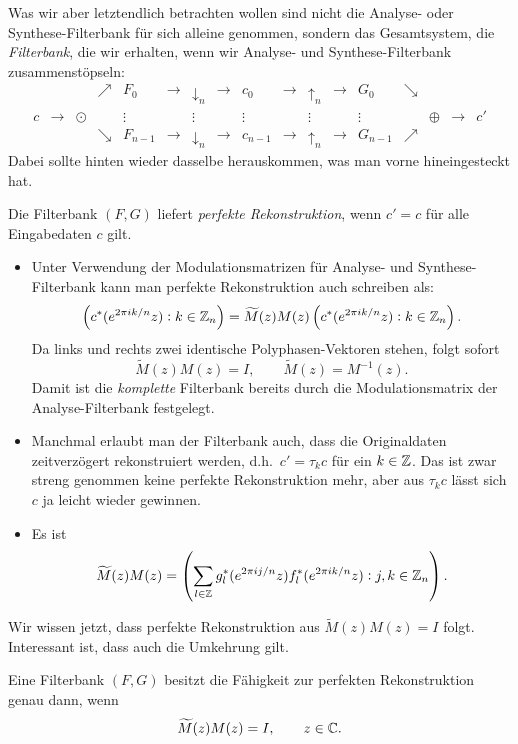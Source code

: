 Was wir aber letztendlich betrachten wollen sind nicht die Analyse- oder Synthese-Filterbank für 
sich alleine genommen, sondern das Gesamtsystem, die \emph{Filterbank}, die wir erhalten, wenn wir
Analyse- und Synthese-Filterbank zusammenstöpseln:
\[
  \begin{array}{*{17}{c}}
    & & & \nearrow & \boxed{F_{0}} & \rightarrow & \boxed{\downarrow_{n}} & \rightarrow & c_{0} 
        & \rightarrow & \boxed{\uparrow_{n}} & \rightarrow & \boxed{G_{0}} & \searrow & & \\
    c & \rightarrow & \odot & & \vdots & & \vdots & & \vdots 
        & & \vdots & & \vdots & & \oplus & \rightarrow & c' \\
    & & & \searrow & \boxed{F_{n-1}} & \rightarrow & \boxed{\downarrow_{n}} & \rightarrow & c_{n-1}
        & \rightarrow & \boxed{\uparrow_{n}} & \rightarrow & \boxed{G_{n-1}} & \nearrow & &
  \end{array}
\]
Dabei sollte hinten wieder dasselbe herauskommen, was man vorne hineingesteckt hat.

\begin{definition}
Die Filterbank $ (F,G) $ liefert \emph{perfekte Rekonstruktion}, wenn $ c' = c $ für alle
Eingabedaten $ c $ gilt.
\end{definition}

\begin{remark}\leavevmode
\begin{itemize}
\item Unter Verwendung der Modulationsmatrizen für Analyse- und Synthese-Filterbank kann man
  perfekte Rekonstruktion auch schreiben als:
  \[
      \left( c^{*}(e^{2\pi ik/n}z) : k \in \mathbb{Z}_{n} \right)
    = \widetilde{M}(z) M(z)
      \left( c^{*}(e^{2\pi ik/n}z) : k \in \mathbb{Z}_{n} \right).
  \]
  Da links und rechts zwei identische Polyphasen-Vektoren stehen, folgt sofort
  \[
    \widetilde{M}(z) M(z) = I, \qquad \widetilde{M}(z) = M^{-1}(z).
  \]
  Damit ist die \emph{komplette} Filterbank bereits durch die Modulationsmatrix der
  Analyse-Filterbank festgelegt.
\item Manchmal erlaubt man der Filterbank auch, dass die Originaldaten zeitverzögert rekonstruiert
  werden, d.h.\ $ c' = \tau_{k} c $ für ein $ k \in \mathbb{Z} $. Das ist zwar streng genommen keine
  perfekte Rekonstruktion mehr, aber aus $ \tau_{k} c $ lässt sich $ c $ ja leicht wieder gewinnen.
\item Es ist
  \[
    \widetilde{M}(z) M(z) =
    \left( 
      \sum_{l \in \mathbb{Z}} g_{l}^{*}(e^{2\pi ij/n}z) f_{l}^{*}(e^{2\pi ik/n}z) : j,k \in \mathbb{Z}_{n}
    \right).
  \]
\end{itemize}
\end{remark}

Wir wissen jetzt, dass perfekte Rekonstruktion aus $ \widetilde{M}(z) M(z) = I $ folgt. Interessant
ist, dass auch die Umkehrung gilt.

\begin{proposition}
Eine Filterbank $ (F,G) $ besitzt die Fähigkeit zur perfekten Rekonstruktion genau dann, wenn
\[
  \widetilde{M}(z) M(z) = I, \qquad z \in \mathbb{C}.
\]
\end{proposition}